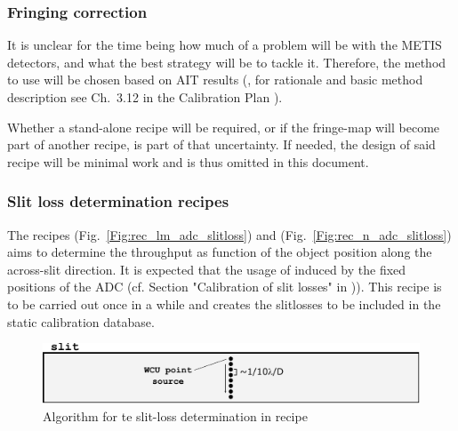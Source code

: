\subsubsection{Fringing correction}
\label{rec:metis_fringing_correction}

It is unclear for the time being how much of a problem will be with the METIS
detectors, and what the best strategy will be to tackle it. Therefore, the
method to use will be chosen based on AIT results (, for rationale and basic method description see Ch.~3.12 in the Calibration Plan \cite{METIS-calibration_plan}).

Whether a stand-alone recipe will be required, or if the fringe-map will become
part of another recipe, is part of that uncertainty. If needed, the design of
said recipe will be minimal work and is thus omitted in this document.

\subsubsection{Slit loss determination recipes }\label{sssec:adc_slitlosses}
The recipes \hyperref[rec:metis_lm_adc_slitloss]{} (Fig.~\ref{Fig:rec_lm_adc_slitloss}) and \hyperref[rec:metis_n_adc_slitloss]{} (Fig.~\ref{Fig:rec_n_adc_slitloss}) aims to determine the throughput as function of the object position along the across-slit direction. It is expected that the usage of  induced by the fixed positions of the \ac{ADC} (cf. Section "Calibration of slit losses" in  \cite{METIS-calibration_plan})). This recipe is to be carried out once in a while and creates the slitlosses to be included in the static calibration database.
\begin{figure}[ht]
  \centering
  \includegraphics[width=0.5\textheight]{figures/slitloss_det.pdf}
  \caption[slitloss determination]{Algorithm for te slit-loss determination in recipe  }
  \label{Fig:slitloss}
\end{figure}

